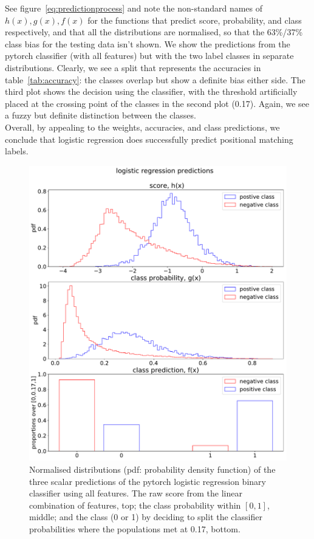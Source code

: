 \documentclass[12pt,a4paper]{article}
\begin{document}
See figure~\ref{eq:predictionprocess} and note the non-standard names of $h(x),g(x),f(x)$ for the functions that predict score, probability, and class respectively, and that all the distributions are normalised, so that the 63\%/37\% class bias for the testing data isn't shown. We show the predictions from the pytorch classifier (with all features) but with the two label classes in separate distributions. Clearly, we see a split that represents the accuracies in table~\ref{tab:accuracy}: the classes overlap but show a definite bias either side. The third plot shows the decision using the classifier, with the threshold artificially placed at the crossing point of the classes in the second plot (0.17). Again, we see a fuzzy but definite distinction between the classes.\\

Overall, by appealing to the weights, accuracies, and class predictions, we conclude that logistic regression does successfully predict positional matching labels. 

\begin{figure}[H]
    \centering
    \includegraphics[width=\textwidth]{pics/torch_lr_predictions.pdf}
    \caption{Normalised distributions (pdf: probability density function) of the three scalar predictions of the pytorch logistic regression binary classifier using all features. The raw score from the linear combination of features, top; the class probability within $[0,1]$, middle; and the class (0 or 1) by deciding to split the classifier probabilities where the populations met at 0.17, bottom.}
    \label{fig:fghpredictions}
\end{figure}
\end{document}

